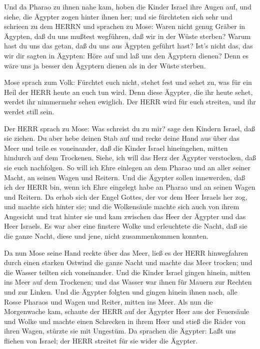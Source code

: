 Und da Pharao zu ihnen nahe kam, hoben die Kinder Israel
ihre Augen auf, und siehe, die Ägypter zogen hinter ihnen her; und sie
fürchteten sich sehr und schrieen zu dem HERRN  und
sprachen zu Mose: Waren nicht genug Gräber in Ägypten, daß du uns
mußtest wegführen, daß wir in der Wüste sterben? Warum hast du uns das
getan, daß du uns aus Ägypten geführt hast?  Ist's nicht
das, das wir dir sagten in Ägypten: Höre auf und laß uns den Ägyptern
dienen? Denn es wäre uns ja besser den Ägyptern dienen als in der Wüste
sterben.

 Mose sprach zum Volk: Fürchtet euch nicht, stehet fest und
sehet zu, was für ein Heil der HERR heute an euch tun wird. Denn diese
Ägypter, die ihr heute sehet, werdet ihr nimmermehr sehen ewiglich.
 Der HERR wird für euch streiten, und ihr werdet still
sein.

 Der HERR sprach zu Mose: Was schreist du zu mir? sage den
Kindern Israel, daß sie ziehen.  Du aber hebe deinen Stab
auf und recke deine Hand aus über das Meer und teile es voneinander, daß
die Kinder Israel hineingehen, mitten hindurch auf dem Trockenen.
 Siehe, ich will das Herz der Ägypter verstocken, daß sie
euch nachfolgen. So will ich Ehre einlegen an dem Pharao und an aller
seiner Macht, an seinen Wagen und Reitern.  Und die Ägypter
sollen innewerden, daß ich der HERR bin, wenn ich Ehre eingelegt habe an
Pharao und an seinen Wagen und Reitern.  Da erhob sich der
Engel Gottes, der vor dem Heer Israels her zog, und machte sich hinter
sie; und die Wolkensäule machte sich auch von ihrem Angesicht und trat
hinter sie  und kam zwischen das Heer der Ägypter und das
Heer Israels. Es war aber eine finstere Wolke und erleuchtete die Nacht,
daß sie die ganze Nacht, diese und jene, nicht zusammenkommen konnten.

 Da nun Mose seine Hand reckte über das Meer, ließ es der
HERR hinwegfahren durch einen starken Ostwind die ganze Nacht und machte
das Meer trocken; und die Wasser teilten sich voneinander. 
Und die Kinder Israel gingen hinein, mitten ins Meer auf dem Trockenen;
und das Wasser war ihnen für Mauern zur Rechten und zur Linken.
 Und die Ägypter folgten und gingen hinein ihnen nach, alle
Rosse Pharaos und Wagen und Reiter, mitten ins Meer.  Als
nun die Morgenwache kam, schaute der HERR auf der Ägypter Heer aus der
Feuersäule und Wolke und machte einen Schrecken in ihrem Heer
 und stieß die Räder von ihren Wagen, stürzte sie mit
Ungestüm. Da sprachen die Ägypter: Laßt uns fliehen von Israel; der HERR
streitet für sie wider die Ägypter.

